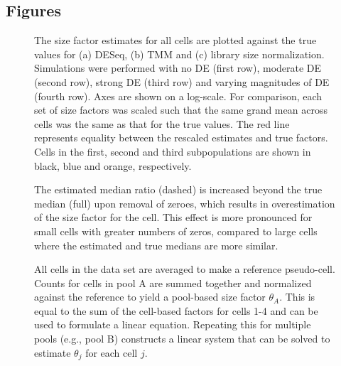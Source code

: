 \documentclass{bmcart}
\begin{document}
\begin{backmatter}


\section*{Figures}
\begin{figure}[!h]
\caption{
    The size factor estimates for all cells are plotted against the true values for (a) DESeq,
        (b) TMM and (c) library size normalization.
    Simulations were performed with no DE (first row), moderate DE (second row), strong DE (third row) and varying magnitudes of DE (fourth row).
    Axes are shown on a log-scale.
    For comparison, each set of size factors was scaled such that the same grand mean across cells was the same as that for the true values.
    The red line represents equality between the rescaled estimates and true factors.
    Cells in the first, second and third subpopulations are shown in black, blue and orange, respectively.
}
\label{fig:existing_sim}
\end{figure}

\begin{figure}[!h]
\caption{
    The estimated median ratio (dashed) is increased beyond the true median (full) upon removal of zeroes, which results in overestimation of the size factor for the cell.
    This effect is more pronounced for small cells with greater numbers of zeros, compared to large cells where the estimated and true medians are more similar.
}
\label{fig:zero_fail}
\end{figure}

\begin{figure}[!h]
\caption{
    All cells in the data set are averaged to make a reference pseudo-cell.
    Counts for cells in pool A are summed together and normalized against the reference to yield a pool-based size factor $\theta_A$.
    This is equal to the sum of the cell-based factors for cells 1-4 and can be used to formulate a linear equation.
    Repeating this for multiple pools (e.g., pool B) constructs a linear system that can be solved to estimate $\theta_j$ for each cell $j$.
}
\label{fig:deconvolution}
\end{figure}


\end{backmatter}
\end{document}
